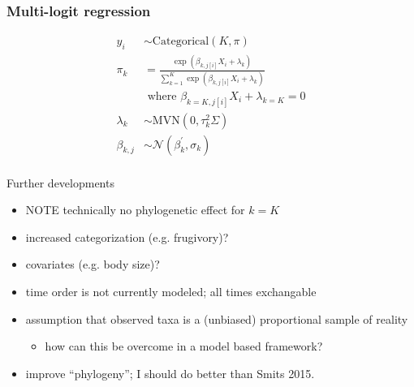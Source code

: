 \documentclass{beamer}
\begin{document}
\begin{frame}
  \frametitle{Multi-logit regression}
  \begin{equation*}
    \begin{aligned}
      y_{i} &\sim \mathrm{Categorical}(K, \pi) \\
      \pi_{k} &= \frac{\exp(\beta_{k, j[i]} X_{i} + \lambda_{k})}{\sum_{k = 1}^{K} \exp(\beta_{k, j[i]} X_{i} + \lambda_{k})} \\ 
      &\text{ where } \beta_{k = K, j[i]} X_{i} + \lambda_{k = K} = 0 \\
      \lambda_{k} &\sim \mathrm{MVN}(0, \tau_{k}^{2}\Sigma) \\
      \beta_{k, j} &\sim \mathcal{N}(\beta_{k}^{\prime}, \sigma_{k}) \\
    \end{aligned}
  \end{equation*}
\end{frame}

\begin{frame}
  \begin{block}{Further developments}
    \begin{itemize}
      \item \uppercase{\alert{note}} technically no phylogenetic effect for \(k = K\)
      \item increased categorization (e.g. frugivory)?
      \item covariates (e.g. body size)?
      \item time order is not currently modeled; all times exchangable
      \item assumption that observed taxa is a (unbiased) proportional sample of reality
        \begin{itemize}
          \item how can this be overcome in a \alert{model based} framework?
        \end{itemize}
      \item improve ``phylogeny''; I should do better than Smits 2015.
    \end{itemize}
  \end{block}
\end{frame}
\end{document}
